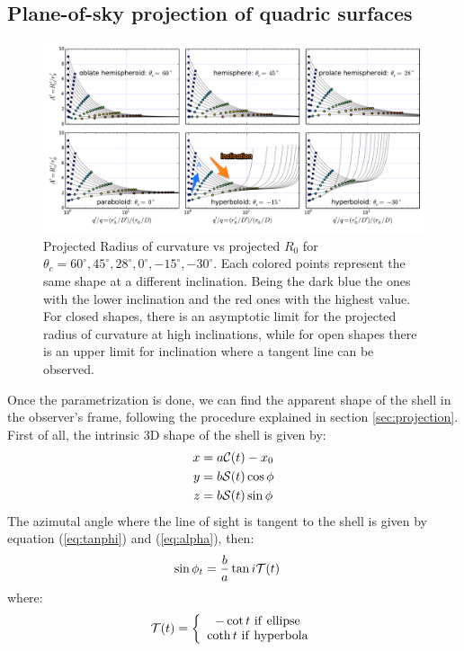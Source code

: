 \subsection{Plane-of-sky projection of quadric surfaces} 
\begin{figure}
\includegraphics[width=0.9\linewidth]{annotated}
\caption{Projected Radius of curvature vs projected $R_0$ for $\theta_c=60^\circ,45^\circ,28^\circ, 0^\circ,-15^\circ,-30^\circ$. Each colored points represent
the same shape at a different inclination. Being the dark blue the ones with the lower inclination and the red ones with the highest value. For closed shapes, there is
an asymptotic limit for the projected radius of curvature at high inclinations, while for open shapes there is an upper limit for inclination where a tangent line can be observed.}
\label{fig:Apqp}
\end{figure}

Once the parametrization is done, we can find the apparent shape of
the shell in the observer's frame, following the procedure explained
in section \ref{sec:projection}.  First of all, the intrinsic 3D shape of the shell is given by:
\begin{align}
x &= a\mathcal{C}(t)-x_0 \\ 
y &= b\mathcal{S}(t)\cos\phi \\
z &=  b\mathcal{S}(t)\sin\phi
\end{align}
The azimutal angle where the line of sight is tangent to the shell is given by equation (\ref{eq:tanphi}) and (\ref{eq:alpha}), then:
\begin{align}
\sin\phi_t &= \frac{b}{a}\tan i\mathcal{T}(t) 
\end{align}
where:
\begin{align}
\mathcal{T}(t) = \left\lbrace \begin{array}{c}
-\cot t ~\mathrm{if~ellipse} \\
\coth t ~\mathrm{if~hyperbola}
\end{array}\right.
\end{align}

